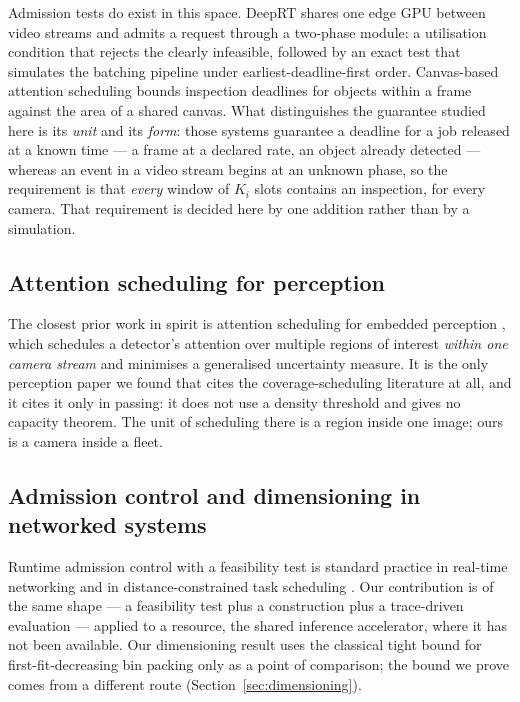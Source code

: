 \documentclass[final,5p,times,twocolumn]{elsarticle}
\theoremstyle{definition}
\newcommand{\Ki}{K_i}
\begin{document}
Admission tests do exist in this space. DeepRT \cite{yang2021deeprt} shares one edge GPU
between video streams and admits a request through a two-phase module: a utilisation condition
that rejects the clearly infeasible, followed by an exact test that simulates the batching
pipeline under earliest-deadline-first order. Canvas-based attention scheduling
\cite{hu2024canvas} bounds inspection deadlines for objects within a frame against the area of a
shared canvas. What distinguishes the guarantee studied here is its \emph{unit} and its
\emph{form}: those systems guarantee a deadline for a job released at a known time --- a frame at
a declared rate, an object already detected --- whereas an event in a video stream begins at an
unknown phase, so the requirement is that \emph{every} window of $\Ki$ slots contains an
inspection, for every camera. That requirement is decided here by one addition rather than by a
simulation.

\subsection{Attention scheduling for perception}
The closest prior work in spirit is attention scheduling for embedded perception
\cite{liu2023attention}, which schedules a detector's attention over multiple regions of interest
\emph{within one camera stream} and minimises a generalised uncertainty measure. It is the only
perception paper we found that cites the coverage-scheduling literature at all, and it cites it
only in passing: it does not use a density threshold and gives no capacity theorem. The unit of
scheduling there is a region inside one image; ours is a camera inside a fleet.

\subsection{Admission control and dimensioning in networked systems}
Runtime admission control with a feasibility test is standard practice in real-time networking
and in distance-constrained task scheduling \cite{han1996distance,hsueh2001distributed}. Our
contribution is of the same shape --- a feasibility test plus a construction plus a trace-driven
evaluation --- applied to a resource, the shared inference accelerator, where it has not been
available. Our dimensioning result uses the classical tight bound for first-fit-decreasing bin
packing \cite{dosa2007ffd} only as a point of comparison; the bound we prove comes from a
different route (Section~\ref{sec:dimensioning}).
\end{document}
